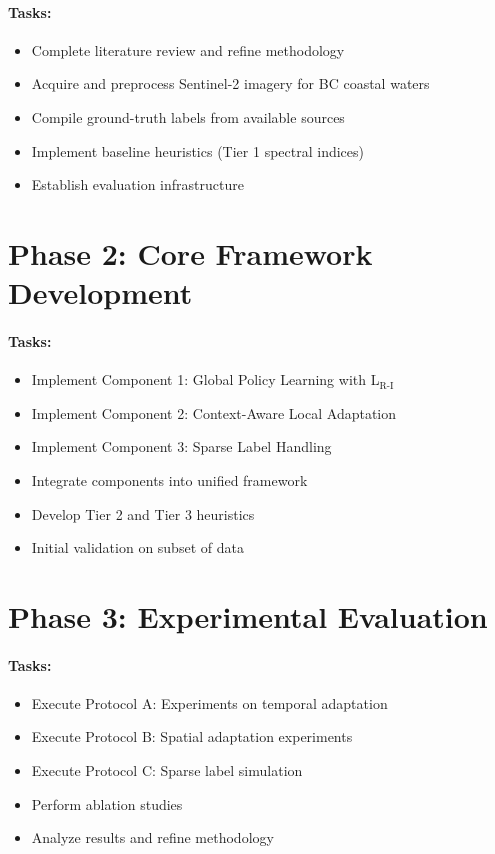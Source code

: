\documentclass[12pt,oneside]{book}
\begin{document}
\paragraph{Tasks:}
\begin{itemize}
    \item Complete literature review and refine methodology
    \item Acquire and preprocess Sentinel-2 imagery for BC coastal waters
    \item Compile ground-truth labels from available sources
    \item Implement baseline heuristics (Tier 1 spectral indices)
    \item Establish evaluation infrastructure
\end{itemize}

\section{Phase 2: Core Framework Development}

\paragraph{Tasks:}
\begin{itemize}
    \item Implement Component 1: Global Policy Learning with L$_\text{R-I}$
    \item Implement Component 2: Context-Aware Local Adaptation
    \item Implement Component 3: Sparse Label Handling
    \item Integrate components into unified framework
    \item Develop Tier 2 and Tier 3 heuristics
    \item Initial validation on subset of data
\end{itemize}

\section{Phase 3: Experimental Evaluation}

\paragraph{Tasks:}
\begin{itemize}
    \item Execute Protocol A: Experiments on temporal adaptation
    \item Execute Protocol B: Spatial adaptation experiments
    \item Execute Protocol C: Sparse label simulation
    \item Perform ablation studies
    \item Analyze results and refine methodology
\end{itemize}
\end{document}
